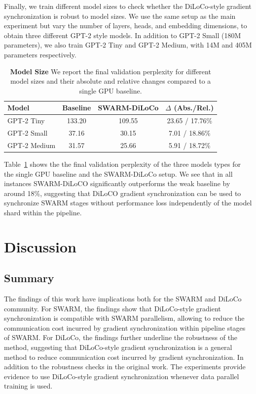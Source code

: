 \documentclass[conference, 10pt]{IEEEtran}
\begin{document}
Finally, we train different model sizes to check whether the DiLoCo-style
gradient synchronization is robust to model sizes. We use the same setup as the
main experiment but vary the number of layers, heads, and embedding dimensions,
to obtain three different GPT-2 style models. In addition to GPT-2 Small (180M
parameters), we also train GPT-2 Tiny and GPT-2 Medium, with 14M and 405M
parameters respectively.

\begin{table}[ht]
\centering
\begin{tabular}{lccc}
\toprule
\textbf{Model} & \textbf{Baseline} & \textbf{SWARM-DiLoCo} & \textbf{$\Delta$ (Abs./Rel.)} \\ 
\midrule
GPT-2 Tiny & 133.20 & 109.55 & 23.65 / 17.76\% \\
GPT-2 Small & 37.16 & 30.15 & 7.01 / 18.86\% \\
GPT-2 Medium & 31.57 & 25.66 & 5.91 / 18.72\% \\
\bottomrule
\end{tabular}
\caption{\textbf{Model Size} We report the final validation perplexity for
different model sizes and their absolute and relative changes compared to a single GPU baseline.}
\label{tab:experiment3}
\end{table}

Table~\ref{tab:experiment3} shows the the final validation perplexity of the
three models types for the single GPU baseline and the SWARM-DiLoCo setup. We
see that in all instances SWARM-DiLoCO significantly outperforms the weak
baseline by around 18\%, suggesting that DiLoCO gradient synchronization can be
used to synchronize SWARM stages without performance loss independently of the
model shard within the pipeline.

\section{Discussion}

\subsection{Summary}

The findings of this work have implications both for the SWARM and DiLoCo
community. For SWARM, the findings show that DiLoCo-style gradient
synchronization is compatible with SWARM parallelism, allowing to reduce the
communication cost incurred by gradient synchronization within pipeline stages
of SWARM. For DiLoCo, the findings further underline the robustness of the
method, suggesting that DiLoCo-style gradient synchronization is a general
method to reduce communication cost incurred by gradient synchronization. In
addition to the robustness checks in the original work. The experiments provide
evidence to use DiLoCo-style gradient synchronization whenever data parallel
training is used.
\end{document}

